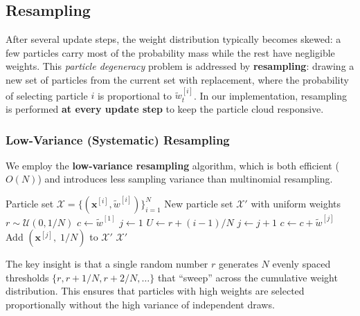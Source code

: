 \documentclass[12pt, a4paper]{article}
\begin{document}
\subsection{Resampling}
\label{subsec:resample}

After several update steps, the weight distribution typically becomes skewed: a few particles carry most of the probability mass while the rest have negligible weights.  This \textit{particle degeneracy} problem is addressed by \textbf{resampling}: drawing a new set of particles from the current set with replacement, where the probability of selecting particle \(i\) is proportional to \(\tilde{w}_t^{[i]}\).  In our implementation, resampling is performed \textbf{at every update step} to keep the particle cloud responsive.

\subsubsection{Low-Variance (Systematic) Resampling}
We employ the \textbf{low-variance resampling} algorithm, which is both efficient (\(O(N)\)) and introduces less sampling variance than multinomial resampling.

\begin{algorithm}[H]
\caption{Low-Variance Resampling}
\label{alg:resample}
\begin{algorithmic}[1]
\Require Particle set $\mathcal{X} = \{(\mathbf{x}^{[i]}, \tilde{w}^{[i]})\}_{i=1}^{N}$
\Ensure  New particle set $\mathcal{X}'$ with uniform weights
\State $r \sim \mathcal{U}(0, 1/N)$ 
\State $c \gets \tilde{w}^{[1]}$
\State $j \gets 1$
  \State $U \gets r + (i - 1) / N$
    \State $j \gets j + 1$
    \State $c \gets c + \tilde{w}^{[j]}$
  \EndWhile
  \State Add $(\mathbf{x}^{[j]},\; 1/N)$ to $\mathcal{X}'$
\EndFor
\State \Return $\mathcal{X}'$
\end{algorithmic}
\end{algorithm}

The key insight is that a single random number \(r\) generates \(N\) evenly spaced thresholds \(\{r, r+1/N, r+2/N, \ldots\}\) that ``sweep'' across the cumulative weight distribution.  This ensures that particles with high weights are selected proportionally without the high variance of independent draws.
\end{document}
